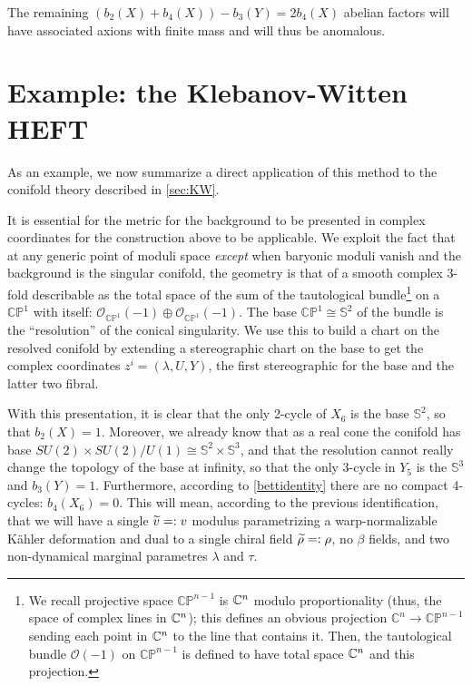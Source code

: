 The remaining $(b_2(X) + b_4(X)) - b_3(Y) = 2b_4(X)$ abelian factors will have associated axions with finite mass and will thus be anomalous.

\section{Example: the Klebanov-Witten HEFT}\label{sec:kwheft}

As an example, we now summarize a direct application of this method to the conifold theory described in \eqref{sec:KW}.

It is essential for the metric for the background to be presented in complex coordinates for the construction above to be applicable. We exploit the fact that at any generic point of moduli space \emph{except} when baryonic moduli vanish and the background is the singular conifold, the geometry is that of a smooth complex 3-fold describable as the total space of the sum of the tautological bundle\footnote{We recall projective space $\mathbb{CP}^{n-1}$ is $\mathbb{C}^n$ modulo proportionality (thus, the space of complex lines in $\mathbb{C}^n$); this defines an obvious projection $\mathbb{C}^n \rightarrow \mathbb{CP}^{n-1}$ sending each point in $\mathbb{C}^n$ to the line that contains it. Then, the tautological bundle $\mathcal{O}(-1)$ on $\mathbb{CP}^{n-1}$ is defined to have total space $\mathbb{C}^n$ and this projection.} on a $\mathbb{CP}^1$ with itself: $\mathcal{O}_{\mathbb{CP}^1}(-1) \oplus \mathcal{O}_{\mathbb{CP}^1}(-1)$. The base $\mathbb{CP}^1 \cong \mathbb{S}^2$ of the bundle is the ``resolution'' of the conical singularity. We use this to build a chart on the resolved conifold by extending a stereographic chart on the base to get the complex coordinates $z^i = (\lambda, U, Y)$, the first stereographic for the base and the latter two fibral.

With this presentation, it is clear that the only 2-cycle of $X_6$ is the base $\mathbb{S}^2$, so that $b_2(X) = 1$. Moreover, we already know that as a real cone the conifold has base $SU(2)\times SU(2) / U(1) \cong \mathbb{S}^2 \times \mathbb{S}^3$, and that the resolution cannot really change the topology of the base at infinity, so that the only 3-cycle in $Y_5$ is the $\mathbb{S}^3$ and $b_3(Y) = 1$. Furthermore, according to \eqref{bettidentity} there are no compact 4-cycles: $b_4(X_6) = 0$. This will mean, according to the previous identification, that we will have a single $\widetilde{v} =: v$ modulus parametrizing a warp-normalizable K\"ahler deformation and dual to a single chiral field $\widetilde{\rho} =: \rho$, no $\beta$ fields, and two non-dynamical marginal parametres $\lambda$ and $\tau$. 

